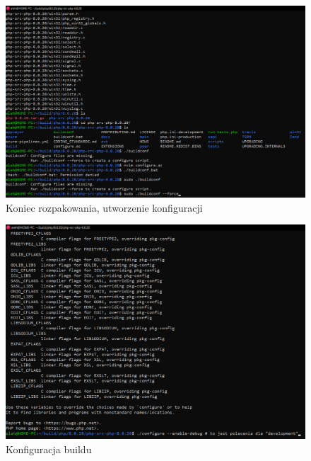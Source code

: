 \documentclass[a4paper,12pt,oneside]{report} %
\begin{document}
\begin{figure}[h]
    \includegraphics[width=16cm]{e7.png}
	\caption{Koniec rozpakowania, utworzenie konfiguracji}
    \label{fig:second}
\end{figure}


\begin{figure}[h]
    \includegraphics[width=16cm]{e8.png}
	\caption{Konfiguracja buildu}
    \label{fig:third}
\end{figure}
\end{document}
